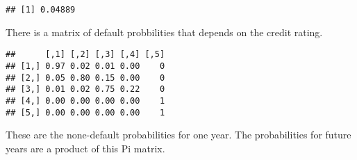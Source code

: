 \documentclass[12pt, a4paper, oneside]{article} %
\begin{document}
\begin{knitrout}
\color{fgcolor}\begin{kframe}
\begin{alltt}
 \hlkwb{<-} \hlstd{(}\hlstd{,} \hlstd{,} \hlstd{,} \hlstd{,} \hlstd{)\{}
   \hlkwb{<-}  \hlopt{*} \hlstd{(}\hlopt{+} \hlopt{*}  \hlopt{+} \hlstd{(} \hlopt{-}  \hlopt{*}  \hlopt{*} \hlopt{/}\hlopt{-}
\hlstd{\}}
 \hlkwb{<-} 
 \hlkwb{<-} 
 \hlkwb{<-} 
 \hlkwb{<-} 
 \hlkwb{<-} 
 \hlkwb{<-} 
\end{alltt}
\begin{verbatim}
## [1] 0.04889
\end{verbatim}
\end{kframe}
\end{knitrout}
There is a matrix of default probbilities that depends on the credit rating. 
\begin{knitrout}
\color{fgcolor}\begin{kframe}
\begin{alltt}
 \hlkwb{<-} \hlstd{()}
\hlstd{Pi[[}\hlstd{]]} \hlkwb{<-} \hlstd{(}\hlstd{(}\hlstd{,} \hlstd{,} \hlstd{,} \hlstd{,} \hlstd{,} \hlstd{,} \hlstd{,} \hlstd{,} \hlstd{,} \hlstd{,} \hlstd{,} \hlstd{,}
    \hlstd{,} \hlstd{,} \hlstd{,} \hlstd{,} \hlstd{,} \hlstd{,} \hlstd{,} \hlstd{,} \hlstd{,} \hlstd{,} \hlstd{,} \hlstd{,} \hlstd{),}  \hlstd{=} \hlstd{)}

\hlstd{Pi[[}\hlstd{]]}
\end{alltt}
\begin{verbatim}
##      [,1] [,2] [,3] [,4] [,5]
## [1,] 0.97 0.02 0.01 0.00    0
## [2,] 0.05 0.80 0.15 0.00    0
## [3,] 0.01 0.02 0.75 0.22    0
## [4,] 0.00 0.00 0.00 0.00    1
## [5,] 0.00 0.00 0.00 0.00    1
\end{verbatim}
\end{kframe}
\end{knitrout}
These are the none-default probabilities for one year.  The probabilities for future years are a product of this Pi matrix. 
\end{document}
